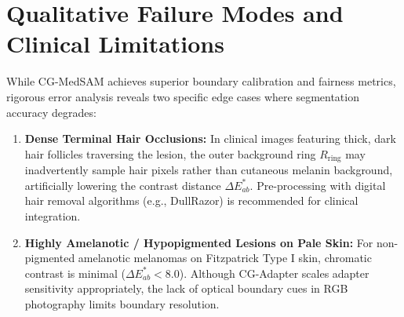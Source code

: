 \documentclass[runningheads]{llncs}
\begin{document}
\section{Qualitative Failure Modes and Clinical Limitations}
\label{sec:failure_modes}
While CG-MedSAM achieves superior boundary calibration and fairness metrics, rigorous error analysis reveals two specific edge cases where segmentation accuracy degrades:
\begin{enumerate}
    \item \textbf{Dense Terminal Hair Occlusions:} In clinical images featuring thick, dark hair follicles traversing the lesion, the outer background ring $R_{\text{ring}}$ may inadvertently sample hair pixels rather than cutaneous melanin background, artificially lowering the contrast distance $\Delta E^*_{ab}$. Pre-processing with digital hair removal algorithms (e.g., DullRazor) is recommended for clinical integration.
    \item \textbf{Highly Amelanotic / Hypopigmented Lesions on Pale Skin:} For non-pigmented amelanotic melanomas on Fitzpatrick Type I skin, chromatic contrast is minimal ($\Delta E^*_{ab} < 8.0$). Although CG-Adapter scales adapter sensitivity appropriately, the lack of optical boundary cues in RGB photography limits boundary resolution.
\end{enumerate}
\end{document}
